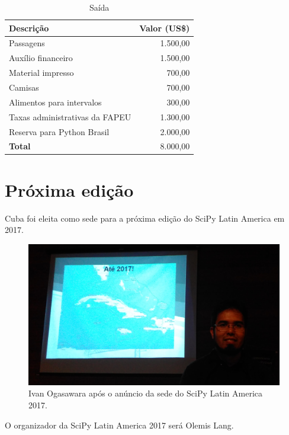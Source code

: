 \documentclass[12pt]{article}
\begin{document}
\begin{table}[!htb]
  \center
  \caption{Saída} \label{tab:saida}
  \begin{tabular}{m{9cm}@{} @{}r}
     \toprule
     \textbf{Descrição} & \textbf{Valor (US\$)} \\
     \midrule
     Passagens & 1.500,00 \\
     Auxílio financeiro & 1.500,00 \\
     Material impresso & 700,00 \\
     Camisas & 700,00 \\
     Alimentos para intervalos & 300,00 \\
     Taxas administrativas da FAPEU & 1.300,00 \\
     Reserva para Python Brasil & 2.000,00 \\
     \midrule
     \textbf{Total} & 8.000,00 \\
     \bottomrule
   \end{tabular}
\end{table}

\clearpage
\newpage

\section*{Próxima edição}

Cuba foi eleita como sede para a próxima edição do SciPy Latin America em 2017.

\begin{figure}[!htb]
\center
\includegraphics[height=.3\textheight]{2017.jpg}
\caption{Ivan Ogasawara após o anúncio da sede do SciPy Latin America 2017.}
\end{figure}

O organizador da SciPy Latin America 2017 será Olemis Lang.
\end{document}
